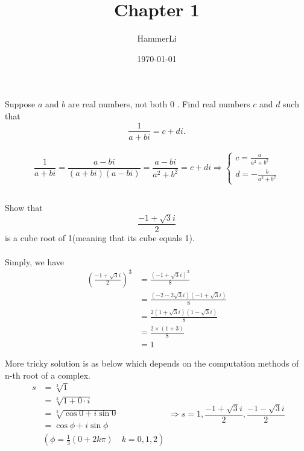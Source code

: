 \documentclass[a4paper]{article}
\title{Chapter 1}
\author{HammerLi}
\date{\today}
\begin{document}
\maketitle

\section{}
\subsection{}
Suppose $a$ and $b$ are real numbers, not both $0$ . Find real numbers $c$ and $d$ such that
$$
    \frac{1}{a+bi} = c+di.
$$
\paragraph{}
$$
    \frac{1}{a+bi} = \frac{a-bi}{(a+bi)(a-bi)} = \frac{a-bi}{a^2+b^2} = c+di
    \Rightarrow \begin{cases}
        c = \frac{a}{a^2+b^2} \\
        d = -\frac{b}{a^2+b^2}
    \end{cases}
$$

\subsection{}
Show that
$$
    \frac{-1+\sqrt{3}i}{2}
$$
is a cube root of 1(meaning that its cube equals 1).
\paragraph{}
Simply, we have
$$
    \begin{aligned}
        (\frac{-1+\sqrt{3}i}{2})^3
         & = \frac{(-1+\sqrt{3}i)^3}{8}              \\
         & = \frac{(-2-2\sqrt{3}i)(-1+\sqrt{3}i)}{8} \\
         & = \frac{2(1+\sqrt{3}i)(1-\sqrt{3}i)}{8}   \\
         & = \frac{2 \times (1+3)}{8}                \\
         & = 1
    \end{aligned}
$$

More tricky solution is as below which depends on the computation methods of n-th root of a complex.
$$
    \begin{aligned}
        s & = \sqrt[3]{1}                                   \\
          & = \sqrt[3]{1+0 \cdot i}                         \\
          & = \sqrt[3]{\cos{0}+i\sin{0}}                    \\
          & = \cos{\phi}+i\sin{\phi}                        \\
          & (\phi = \frac{1}{3}(0+2k\pi) \quad k = 0, 1, 2)
    \end{aligned}
    \Rightarrow s = 1, \frac{-1+\sqrt{3}i}{2}, \frac{-1-\sqrt{3}i}{2}
$$
\end{document}
